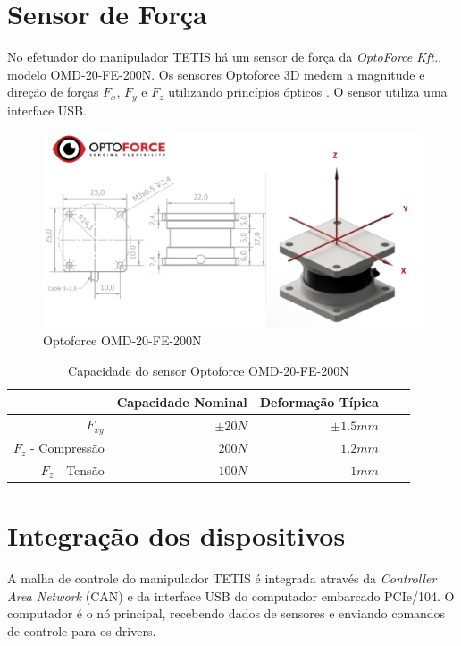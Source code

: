 \section{Sensor de Força}

No efetuador do manipulador TETIS há um sensor de força da \textit{OptoForce Kft.}, modelo OMD-20-FE-200N. Os sensores Optoforce 3D medem a magnitude e direção de forças $F_x$, $F_y$ e $F_z$ utilizando princípios ópticos \cite{optoforce}. O sensor utiliza uma interface USB. 

\begin{figure}[!ht]
\centering
  \includegraphics[width=\linewidth]{./img/optoforce.png}
  \caption{Optoforce OMD-20-FE-200N \cite{optoforce}}
  \label{fig:optoforce}
\end{figure}%

\begin{table}[h!]
\centering
\caption{Capacidade do sensor Optoforce OMD-20-FE-200N}
\label{tab:dh_tetis}
\begin{tabular}{rrrrr} \hline
 &  Capacidade Nominal & Deformação Típica \\ \hline
 $F_{xy}$ & $\pm 20N$ & $\pm 1.5 mm$ \\
 $F_z $ - Compressão & $200N$ & $1.2 mm$ \\
 $F_z $ - Tensão & $100N$ & $1 mm$ \\
\hline
\end{tabular}
\end{table}


\section{Integração dos dispositivos}

A malha de controle do manipulador TETIS é integrada através da \textit{Controller Area Network} (CAN) e da interface USB do computador embarcado PCIe/104. O computador é o nó principal, recebendo dados de sensores e enviando comandos de controle para os drivers.

